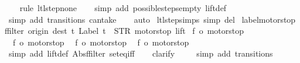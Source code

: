 \begin{isabellebody}
\ \ \isamarkupfalse%
\ {\isacharparenleft}rule\ ltl{\isacharunderscore}step{\isacharunderscore}none{\isacharparenright}\isanewline
\ \ \isamarkupfalse%
\ {\isacharparenleft}simp\ add{\isacharcolon}\ possible{\isacharunderscore}steps{\isacharunderscore}empty\ lift{\isacharunderscore}def{\isacharparenright}\isanewline
\ \ \isamarkupfalse%
\ {\isacharparenleft}simp\ add{\isacharcolon}\ transitions\ can{\isacharunderscore}take{\isacharparenright}\isanewline
\ \ \isamarkupfalse%
\ auto%
\endisatagproof
{\isafoldproof}%
%
\isadelimproof
\isanewline
%
\endisadelimproof
\isanewline
{}\isamarkupfalse%
\ ltl{\isacharunderscore}step{\isachardot}simps\ {\isacharbrackleft}simp\ del{\isacharbrackright}\isanewline
\isanewline
{}\isamarkupfalse%
\ label{\isacharunderscore}motorstop{\isacharcolon}\isanewline
{\isachardoublequoteopen}{\isacharparenleft}ffilter\ {\isacharparenleft}{\isasymlambda}{\isacharparenleft}{\isacharparenleft}origin{\isacharcomma}\ dest{\isacharparenright}{\isacharcomma}\ t{\isacharparenright}{\isachardot}\ Label\ t\ {\isacharequal}\ STR\ {\isacharprime}{\isacharprime}motorstop{\isacharprime}{\isacharprime}{\isacharparenright}\ lift{\isacharparenright}\ {\isacharequal}\isanewline
{\isacharbraceleft}{\isacharbar}{\isacharparenleft}{\isacharparenleft}f{}{\isacharcomma}\ o{}{\isacharparenright}{\isacharcomma}\ motorstop{}{\isacharparenright}{\isacharcomma}\isanewline
\ \ {\isacharparenleft}{\isacharparenleft}f{}{\isacharcomma}\ o{}{\isacharparenright}{\isacharcomma}\ motorstop{}{\isacharparenright}{\isacharcomma}\isanewline
\ \ {\isacharparenleft}{\isacharparenleft}f{}{\isacharcomma}\ o{}{\isacharparenright}{\isacharcomma}\ motorstop{}{\isacharparenright}{\isacharcomma}\isanewline
\ \ {\isacharparenleft}{\isacharparenleft}f{}{\isacharcomma}\ o{}{\isacharparenright}{\isacharcomma}\ motorstop{}{\isacharparenright}\isanewline
{\isacharbar}{\isacharbraceright}{\isachardoublequoteclose}\isanewline
%
\isadelimproof
\ \ %
\endisadelimproof
%
\isatagproof
{}\isamarkupfalse%
\ {\isacharparenleft}simp\ add{\isacharcolon}\ lift{\isacharunderscore}def\ Abs{\isacharunderscore}ffilter\ set{\isacharunderscore}eq{\isacharunderscore}iff{\isacharparenright}\isanewline
\ \ \isamarkupfalse%
\ clarify\isanewline
\ \ \ \isamarkupfalse%
\ {\isacharparenleft}simp\ add{\isacharcolon}\ transitions{\isacharparenright}\isanewline

\end{isabellebody}
